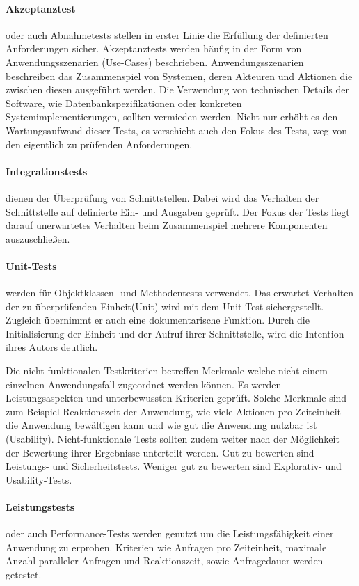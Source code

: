 \paragraph{Akzeptanztest}
oder auch Abnahmetests stellen in erster Linie die Erfüllung der definierten Anforderungen sicher. Akzeptanztests werden häufig in der Form von Anwendungsszenarien (Use-Cases) beschrieben. Anwendungsszenarien beschreiben das Zusammenspiel von Systemen, deren Akteuren und Aktionen die zwischen diesen ausgeführt werden. Die Verwendung von technischen Details der Software, wie Datenbankspezifikationen oder konkreten Systemimplementierungen, sollten vermieden werden. Nicht nur erhöht es den Wartungsaufwand dieser Tests, es verschiebt auch den Fokus des Tests, weg von den eigentlich zu prüfenden Anforderungen.

\paragraph{Integrationstests}

dienen der Überprüfung von Schnittstellen. Dabei wird das Verhalten der Schnittstelle auf definierte Ein- und Ausgaben geprüft. Der Fokus der Tests liegt darauf unerwartetes Verhalten beim Zusammenspiel mehrere Komponenten auszuschließen.

\paragraph{Unit-Tests}

werden für Objektklassen- und Methodentests verwendet. Das erwartet Verhalten der zu überprüfenden Einheit(Unit) wird mit dem Unit-Test sichergestellt. Zugleich übernimmt er auch eine dokumentarische Funktion. Durch die Initialisierung der Einheit und der Aufruf ihrer Schnittstelle, wird die Intention ihres Autors deutlich.

Die nicht-funktionalen Testkriterien betreffen Merkmale welche nicht einem einzelnen Anwendungsfall zugeordnet werden können. Es werden Leistungsaspekten und unterbewussten Kriterien geprüft. Solche Merkmale sind zum Beispiel Reaktionszeit der Anwendung, wie viele Aktionen pro Zeiteinheit die Anwendung bewältigen kann und wie gut die Anwendung nutzbar ist (Usability). Nicht-funktionale Tests sollten zudem weiter nach der Möglichkeit der Bewertung ihrer Ergebnisse unterteilt werden. Gut zu bewerten sind Leistungs- und Sicherheitstests. Weniger gut zu bewerten sind Explorativ- und Usability-Tests.

\paragraph{Leistungstests} oder auch Performance-Tests werden genutzt um die Leistungsfähigkeit einer Anwendung zu erproben. Kriterien wie Anfragen pro Zeiteinheit, maximale Anzahl paralleler Anfragen und Reaktionszeit, sowie Anfragedauer werden getestet.
